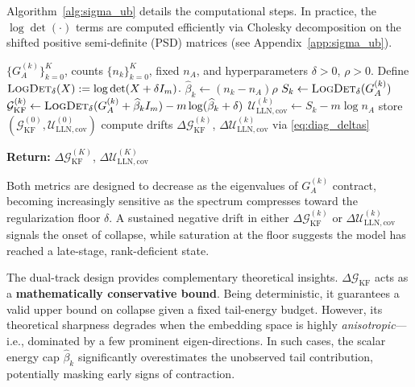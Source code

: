 \documentclass{article}
\theoremstyle{plain}
\theoremstyle{definition}
\theoremstyle{remark}
\newcommand{\sgma}{\textsc{Sigma}\xspace}
\begin{document}
Algorithm~\ref{alg:sigma_ub} details the computational steps. In practice, the $\log\det(\cdot)$ terms are computed efficiently via Cholesky decomposition on the shifted positive semi-definite (PSD) matrices (see Appendix~\ref{app:sigma_ub}).

\begin{algorithm}[t]
\caption{\sgma-UB Collapse Monitoring (upper-bound diagnostics)}
\begin{algorithmic}[1] \label{alg:sigma_ub}
\REQUIRE $\{G_A^{(k)}\}_{k=0}^K$, counts $\{n_k\}_{k=0}^K$, fixed $n_A$, and hyperparameters $\delta>0$, $\rho>0$.
\STATE Define $\textsc{LogDet}_\delta(X):=\log\det(X+\delta I_m)$.
  \STATE $\widehat{\beta}_k \gets (n_k-n_A)\rho$
  \STATE $S_k \gets \textsc{LogDet}_\delta(G_A^{(k)})$
  \STATE $\mathcal{G}_{\mathrm{KF}}^{(k)} \gets \textsc{LogDet}_\delta(G_A^{(k)}+\widehat{\beta}_k I_m) - m\log(\widehat{\beta}_k+\delta)$
  \STATE $\mathcal{U}_{\mathrm{LLN,cov}}^{(k)} \gets S_k - m\log n_A$
  \STATE store $(\mathcal{G}_{\mathrm{KF}}^{(0)},\mathcal{U}_{\mathrm{LLN,cov}}^{(0)})$
  \ELSE
  \STATE compute drifts $\Delta\mathcal{G}_{\mathrm{KF}}^{(k)}$, $\Delta\mathcal{U}_{\mathrm{LLN,cov}}^{(k)}$ via \eqref{eq:diag_deltas}
  \ENDIF
\ENDFOR
\end{algorithmic}
\textbf{Return:} $\Delta\mathcal{G}_{\mathrm{KF}}^{(K)}$, $\Delta\mathcal{U}_{\mathrm{LLN,cov}}^{(K)}$
\end{algorithm}

Both metrics are designed to decrease as the eigenvalues of $G_A^{(k)}$ contract, becoming increasingly sensitive as the spectrum compresses toward the regularization floor $\delta$. A sustained negative drift in either $\Delta\mathcal{G}_{\mathrm{KF}}^{(k)}$ or $\Delta\mathcal{U}_{\mathrm{LLN,cov}}^{(k)}$ signals the onset of collapse, while saturation at the floor suggests the model has reached a late-stage, rank-deficient state.

The dual-track design provides complementary theoretical insights. $\Delta\mathcal{G}_{\mathrm{KF}}$ acts as a \textbf{mathematically conservative bound}. Being deterministic, it guarantees a valid upper bound on collapse given a fixed tail-energy budget. However, its theoretical sharpness degrades when the embedding space is highly \textit{anisotropic}—i.e., dominated by a few prominent eigen-directions. In such cases, the scalar energy cap $\widehat{\beta}_k$ significantly overestimates the unobserved tail contribution, potentially masking early signs of contraction.
\end{document}
